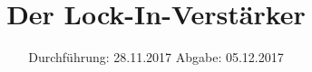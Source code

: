 
\usepackage{wrapfig}
\subject{VERSUCH 303}
\title{Der Lock-In-Verstärker}
\date{%
  \hspace{-2.5em}
  Durchführung: 28.11.2017
  \hspace{4em}
  Abgabe: 05.12.2017
}


  \setlength{\parindent}{0em}
  \maketitle
  \thispagestyle{empty}
  \newpage
  \tableofcontents
  \newpage





\newpage
\printbibliography{}


